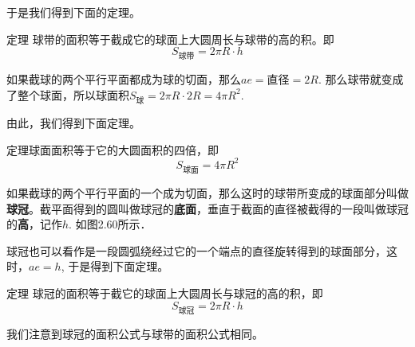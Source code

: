于是我们得到下面的定理。

\begin{blk}
    {定理} 球带的面积等于截成它的球面上大圆周长与球带的高的积。即
\[S_{\text{球带}}=2\pi R\cdot h\]
\end{blk}

如果截球的两个平行平面都成为球的切面，那么$ae=$直径$=2R$. 那么球带就变成了整个球面，所以球面积$S_{\text{球}}=2\pi R\cdot 2R=4\pi R^2$.

由此，我们得到下面定理。

\begin{blk}
    {定理}球面面积等于它的大圆面积的四倍，即
\[S_{\text{球面}}=4\pi R^2\]
\end{blk}

如果截球的两个平行平面的一个成为切面，那么这时的球带所变成的球面部分叫做\textbf{球冠}。截平面得到的圆叫做球冠的\textbf{底面}，垂直于截面的直径被截得的一段叫做球冠的\textbf{高}，记作$h$. 如图2.60所示．

球冠也可以看作是一段圆弧绕经过它的一个端点的直径旋转得到的球面部分，这时，$ae=h$, 于是得到下面定理。


\begin{blk}
    {定理} 球冠的面积等于截它的球面上大圆周长与球冠的高的积，即
\[S_{\text{球冠}}=2\pi R\cdot h\]
\end{blk}

我们注意到球冠的面积公式与球带的面积公式相同。

